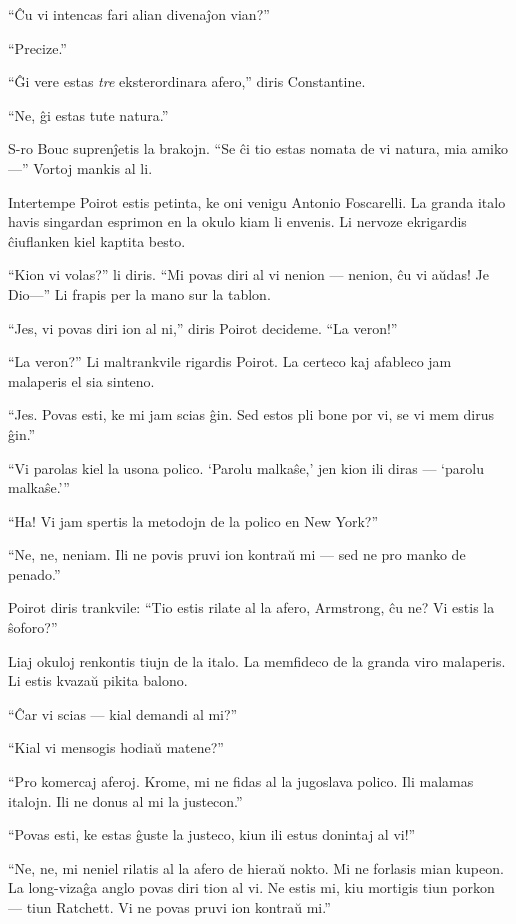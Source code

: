 ``Ĉu vi intencas fari alian divenaĵon vian?''

``Precize.''

``Ĝi vere estas \emph{tre} eksterordinara afero,'' diris Constantine.

``Ne, ĝi estas tute natura.''

S-ro Bouc suprenĵetis la brakojn. ``Se ĉi tio estas nomata de vi natura, mia amiko---'' Vortoj mankis al li.

Intertempe Poirot estis petinta, ke oni venigu Antonio Foscarelli. La granda italo havis singardan esprimon en la okulo kiam li envenis. Li nervoze ekrigardis ĉiuflanken kiel kaptita besto.

``Kion vi volas?'' li diris. ``Mi povas diri al vi nenion --- nenion, ĉu vi aŭdas! Je Dio---'' Li frapis per la mano sur la tablon.

``Jes, vi povas diri ion al ni,'' diris Poirot decideme. ``La veron!''

``La veron?'' Li maltrankvile rigardis Poirot. La certeco kaj afableco jam malaperis el sia sinteno.

``Jes. Povas esti, ke mi jam scias ĝin. Sed estos pli bone por vi, se vi mem dirus ĝin.''

``Vi parolas kiel la usona polico. `Parolu malkaŝe,' jen kion ili diras --- `parolu malkaŝe.'''

``Ha! Vi jam spertis la metodojn de la polico en New York?''

``Ne, ne, neniam. Ili ne povis pruvi ion kontraŭ mi --- sed ne pro manko de penado.''

Poirot diris trankvile: ``Tio estis rilate al la afero, Armstrong, ĉu ne? Vi estis la ŝoforo?''

Liaj okuloj renkontis tiujn de la italo. La memfideco de la granda viro malaperis. Li estis kvazaŭ pikita balono.

``Ĉar vi scias --- kial demandi al mi?''

``Kial vi mensogis hodiaŭ matene?''

``Pro komercaj aferoj. Krome, mi ne fidas al la jugoslava polico. Ili malamas italojn. Ili ne donus al mi la justecon.''

``Povas esti, ke estas ĝuste la justeco, kiun ili estus donintaj al vi!''

``Ne, ne, mi neniel rilatis al la afero de hieraŭ nokto. Mi ne forlasis mian kupeon. La long-vizaĝa anglo povas diri tion al vi. Ne estis mi, kiu mortigis tiun porkon --- tiun Ratchett. Vi ne povas pruvi ion kontraŭ mi.''

